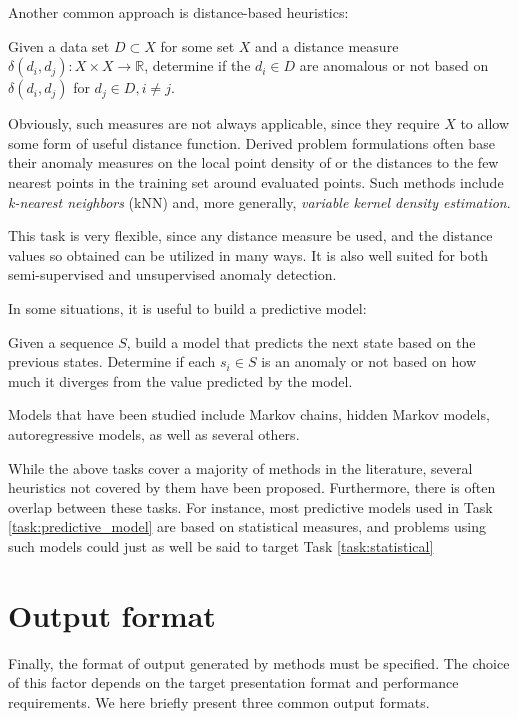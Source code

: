 Another common approach is distance-based heuristics:
\begin{task}
  Given a data set $D \subset X$ for some set $X$ and a distance measure $\delta(d_i, d_j): X \times X \rightarrow \mathbb{R}$, determine if the $d_i \in D$ are anomalous or not based on $\delta(d_i, d_j)$ for $d_j \in D, i \neq j$.
\end{task}
Obviously, such measures are not always applicable, since they require $X$ to allow some form of useful distance function. Derived problem formulations often base their anomaly measures on the local point density of or the distances to the few nearest points in the training set around evaluated points. Such methods include \emph{k-nearest neighbors} (kNN) and, more generally, \emph{variable kernel density estimation}.

This task is very flexible, since any distance measure be used, and the distance values so obtained can be utilized in many ways. It is also well suited for both semi-supervised and unsupervised anomaly detection.

In some situations, it is useful to build a predictive model:
\begin{task}
  \label{task:predictive_model}
  Given a sequence $S$, build a model that predicts the next state based on the previous states. Determine if each $s_i \in S$ is an anomaly or not based on how much it diverges from the value predicted by the model.
\end{task}
Models that have been studied include Markov chains, hidden Markov models, autoregressive models, as well as several others. 

While the above tasks cover a majority of methods in the literature, several heuristics not covered by them have been proposed. Furthermore, there is often overlap between these tasks. For instance, most predictive models used in Task \ref{task:predictive_model} are based on statistical measures, and problems using such models could just as well be said to target Task \ref{task:statistical}

\section{Output format}
\label{sect:output_format}

Finally, the format of output generated by methods must be specified. The choice of this factor depends on the target presentation format and performance requirements. We here briefly present three common output formats.

